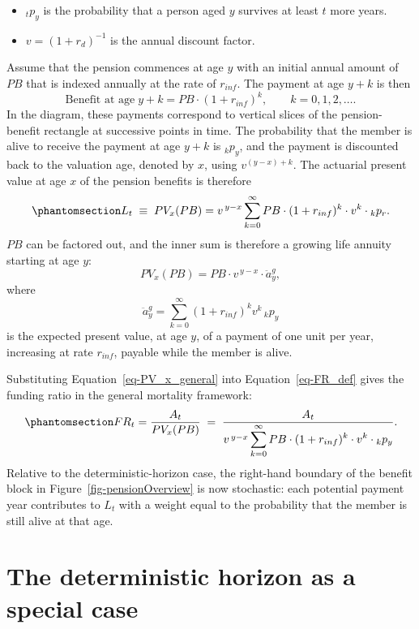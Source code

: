 \documentclass[
  letterpaper,
  DIV=11,
  numbers=noendperiod]{scrreprt}
\providecommand{\tightlist}{%
  \setlength{\itemsep}{0pt}\setlength{\parskip}{0pt}}
\begin{document}
\begin{itemize}
\tightlist
\item
  \({}_tp_y\) is the probability that a person aged \(y\) survives at
  least \(t\) more years.
\item
  \(v = (1 + r_d)^{-1}\) is the annual discount factor.
\end{itemize}

Assume that the pension commences at age \(y\) with an initial annual
amount of \(PB\) that is indexed annually at the rate of \(r_{inf}\).
The payment at age \(y + k\) is then \[
    \text{Benefit at age}\; y + k = PB \cdot (1 + r_{inf})^{k}, \qquad k = 0,1,2,\dots.
\] In the diagram, these payments correspond to vertical slices of the
pension-benefit rectangle at successive points in time. The probability
that the member is alive to receive the payment at age \(y + k\) is
\({}_k p_y\), and the payment is discounted back to the valuation age,
denoted by \(x\), using \(v^{(y - x)+k}\). The actuarial present value
at age \(x\) of the pension benefits is therefore
\begin{equation}\protect\phantomsection\label{eq-PV_x_general}{
    L_t \;\equiv\; PV_x(PB) = v^{\,y - x} \sum_{k=0}^{\infty} PB \cdot (1 + r_{inf})^{k} \cdot v^{k} \cdot {}_k p_r.
}\end{equation} \(PB\) can be factored out, and the inner sum is
therefore a growing life annuity starting at age \(y\): \[
    PV_x(PB) = PB \cdot v^{\,y - x} \cdot \ddot{a}^{g}_y,
\] where \[
    \ddot{a}^{g}_y = \sum_{k=0}^{\infty} (1 + r_{inf})^{k} v^{k} \, {}_k p_y
\] is the expected present value, at age \(y\), of a payment of one unit
per year, increasing at rate \(r_{inf}\), payable while the member is
alive.

Substituting Equation~\ref{eq-PV_x_general} into
Equation~\ref{eq-FR_def} gives the funding ratio in the general
mortality framework:
\begin{equation}\protect\phantomsection\label{eq-FR_general}{
    FR_t = \frac{A_t}{PV_x(PB)} \;=\; \frac{A_t}{v^{\,y - x} \displaystyle \sum_{k=0}^{\infty} PB \cdot (1 + r_{inf})^{k} \cdot v^{k} \cdot {}_k p_y }.
}\end{equation} Relative to the deterministic-horizon case, the
right-hand boundary of the benefit block in
Figure~\ref{fig-pensionOverview} is now stochastic: each potential
payment year contributes to \(L_t\) with a weight equal to the
probability that the member is still alive at that age.

\section{The deterministic horizon as a special
case}\label{the-deterministic-horizon-as-a-special-case}
\end{document}

